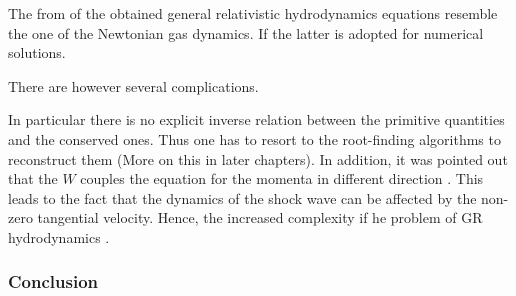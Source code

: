 The from of the obtained general relativistic hydrodynamics equations resemble the one of the Newtonian gas dynamics. If the latter is adopted for numerical solutions. 

There are however several complications. 

In particular there is no explicit inverse relation between the primitive quantities and the conserved ones. 
Thus one has to resort to the root-finding algorithms to reconstruct them (More on this in later chapters). 
In addition, it was pointed out that the $W$ couples the equation for the momenta in different direction \cite{Pons:2000,Rezzolla:2002ra,Rezzolla:2002cc,Aloy:2006rd}. 
This leads to the fact that the dynamics of the shock wave can be affected by the non-zero tangential velocity. 
Hence, the increased complexity if he problem of GR hydrodynamics \cite{Mignone:2005ns,Zhang:2005qy}.



\subsubsection{Conclusion}


